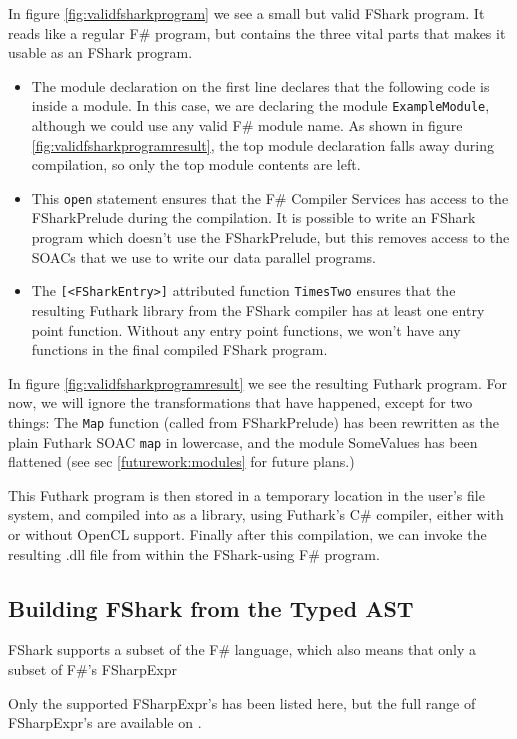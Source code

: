   
In figure \ref{fig:validfsharkprogram} we see a small but valid FShark program. It
reads like a regular F\# program, but contains the three vital parts that makes
it usable as an FShark program.
\begin{itemize}
\item The module declaration on the first line declares that the following code
  is inside a module. In this case, we are declaring the module
  \texttt{ExampleModule}, although we could use any valid F\# module name.
  As shown in figure \ref{fig:validfsharkprogramresult}, the top module
  declaration falls away during compilation, so only the top module contents are
  left.

\item This \texttt{open} statement ensures that the F\# Compiler Services has
  access to the FSharkPrelude during the compilation. It is possible to write an
  FShark program which doesn't use the FSharkPrelude, but this removes access to
  the SOACs that we use to write our data parallel programs.

\item The \texttt{[<FSharkEntry>]} attributed function \texttt{TimesTwo} ensures
  that the resulting Futhark library from the FShark compiler has at least one
  entry point function.
  Without any entry point functions, we won't have any functions in the final
  compiled FShark program.
\end{itemize}

In figure \ref{fig:validfsharkprogramresult} we see the resulting Futhark program.
For now, we will ignore the transformations that have happened, except for two
things: The \texttt{Map} function (called from FSharkPrelude) has been rewritten
as the plain Futhark SOAC \texttt{map} in lowercase, and the module SomeValues has been
flattened (see sec \ref{futurework:modules} for future plans.)

This Futhark program is then stored in a temporary location in the user's file
system, and compiled into as a library, using Futhark's C\# compiler, either
with or without OpenCL support. Finally after this compilation, we can invoke
the resulting .dll file from within the FShark-using F\# program.

\subsection{Building FShark from the Typed AST}
\label{sec:fsharkcompilerrules}
FShark supports a subset of the F\# language, which also means that only a
subset of F\#'s FSharpExpr

Only the supported FSharpExpr's has been listed here, but the full range of
FSharpExpr's are available on \cite{typedtree}.


